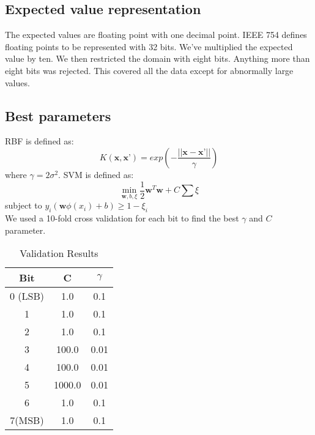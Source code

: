 \documentclass[pdftex,a4paper,12pt]{article}
\begin{document}
\subsection{Expected value representation}
The expected values are floating point with one decimal point.  IEEE 754 defines floating points to be represented with 32 bits.  We've multiplied the expected value by ten.  We then restricted the domain with eight bits.  Anything more than eight bits was rejected.  This covered all the data except for abnormally large values.
 \subsection{Best parameters}
 RBF is defined as: 
$$K(\textbf{x},\textbf{x'}) = exp(-\frac{||\textbf{x} - \textbf{x'} ||}{\gamma} )$$ where $\gamma = 2\sigma^2$\cite{vert2004primer}.  SVM is defined as:
\begin{equation}
\mathop{min}_{\textbf{w}, b, \textbf{$\xi$} } \frac{1}{2} \textbf{w}^T\textbf{w} + C\sum {\xi}
\end{equation}
subject to $y_i(\textbf{w}\phi(x_i) + b) \geq 1 - \xi_i$ \cite{LIBSVM}\\
We used a 10-fold cross validation for each bit to find the best $\gamma$ and $C$ parameter.

\begin{table}[h]
{\centering
\begin{tabular}{|c|c|c|} \hline
	Bit 		&			C			&			$\gamma$		\\	\hline
0 (LSB)		&			1.0		&			0.1					\\	\hline
1 				&			1.0		&			0.1				  \\	\hline
2 				&			1.0		&			0.1					\\	\hline
3 				&			100.0		&		0.01				\\	\hline
4 				&			100.0		&		0.01				\\	\hline
5 				&			1000.0	&		0.01				\\	\hline
6 				&			1.0		&			0.1					\\	\hline
7(MSB) 		&			1.0		&			0.1					\\	\hline
\end{tabular}
\caption{Validation Results}          
\label{table:valresults}}
\end{table}
\end{document}
